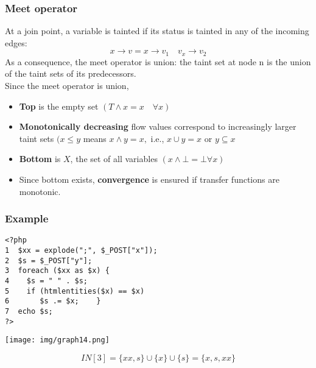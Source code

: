 \documentclass[a4paper, 10pt, titlepage]{article}
\begin{document}
\subsubsection*{Meet operator}
At a join point, a variable is tainted if its status is tainted in any of the incoming edges: 
$$x \rightarrow v = x \rightarrow v_1 \quad v_x \rightarrow v_2$$
As a consequence, the meet operator is union: the taint set at node n is the union of the taint sets of its predecessors. \medskip \\
Since the meet operator is union,
\begin{itemize}
\item \textbf{Top} is the empty set $(T \wedge x = x \quad \forall x)$
\item \textbf{Monotonically decreasing} flow values correspond to increasingly larger taint sets $(x \leq y$ means $x \wedge y = x,$ i.e., $x \cup y = x$ or $y \subseteq x$
\item \textbf{Bottom} is $X$, the set of all variables $(x \wedge \bot = \bot \forall x)$
\item Since bottom exists, \textbf{convergence} is ensured if transfer functions are monotonic.
\end{itemize}

\subsubsection*{Example}
\begin{minipage}{0.5\textwidth}
\begin{small}
\begin{lstlisting}
<?php 
1  $xx = explode(";", $_POST["x"]); 
2  $s = $_POST["y"]; 
3  foreach ($xx as $x) { 
4    $s = " " . $s; 
5    if (htmlentities($x) == $x) 
6       $s .= $x;    } 
7  echo $s; 
?>
\end{lstlisting}
\end{small}
\end{minipage}
\hfill\vline\hfill
\begin{minipage}{0.4\textwidth}
\begin{center}
\texttt{[image: img/graph14.png]}
\end{center}
\begin{small}
$$IN[3] = \{xx, s\} \cup \{x\} \cup \{s\} = \{x, s, xx\}$$
\end{small}
\end{minipage}
\end{document}
